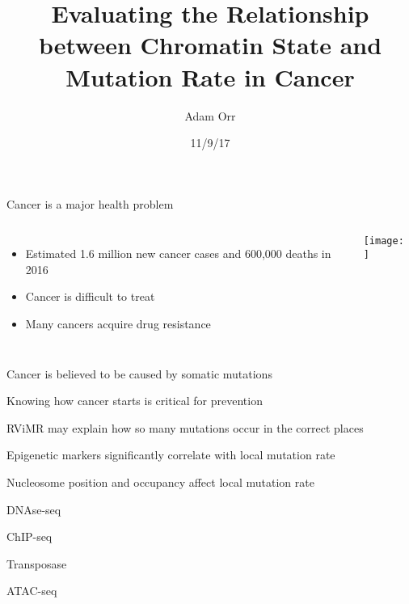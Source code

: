 \documentclass{beamer}
\title[Chromatin and Mutation]{Evaluating the Relationship between Chromatin State and Mutation Rate in Cancer}
\date{11/9/17}
\author{Adam Orr}
\begin{document}
\frame{\titlepage}

\begin{frame}{Cancer is a major health problem}
\begin{columns}
\begin{itemize}
\item Estimated 1.6 million new cancer cases and 600,000 deaths in 2016 \footnotemark
\item Cancer is difficult to treat
\item Many cancers acquire drug resistance \parencite{holohan_cancer_2013}
\end{itemize}
\texttt{[image: ]}
\end{columns}
\end{frame}

\begin{frame}{Cancer is believed to be caused by somatic mutations}
\end{frame}

\begin{frame}{Knowing how cancer starts is critical for prevention}
\end{frame}

\begin{frame}{RViMR may explain how so many mutations occur in the correct places}
\end{frame}

\begin{frame}{Epigenetic markers significantly correlate with local mutation rate}
\end{frame}

\begin{frame}{Nucleosome position and occupancy affect local mutation rate}
\end{frame}


\begin{frame}{DNAse-seq}
\end{frame}

\begin{frame}{ChIP-seq}
\end{frame}

\begin{frame}{Transposase}
\end{frame}

\begin{frame}{ATAC-seq}
\end{frame}
\end{document}
